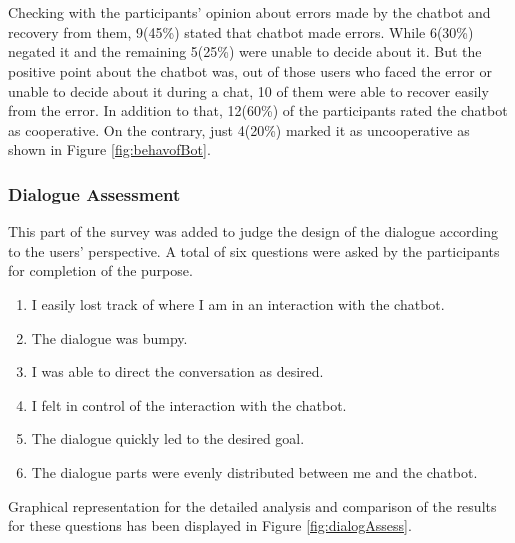 \\~\\
Checking with the participants' opinion about errors made by the chatbot and recovery from them, 9(45\%) stated that chatbot made errors. While 6(30\%) negated it and the remaining 5(25\%) were unable to decide about it. But the positive point about the chatbot was, out of those users who faced the error or unable to decide about it during a chat, 10 of them were able to recover easily from the error. In addition to that, 12(60\%) of the participants rated the chatbot as cooperative. On the contrary, just 4(20\%) marked it as uncooperative as shown in Figure \ref{fig:behavofBot}.


\subsubsection*{Dialogue Assessment}
This part of the survey was added to judge the design of the dialogue according to the users' perspective. A total of six questions were asked by the participants for completion of the purpose.
\begin{enumerate}
    \item I easily lost track of where I am in an interaction with the chatbot.
    \item The dialogue was bumpy.
    \item I was able to direct the conversation as desired.
    \item I felt in control of the interaction with the chatbot.
    \item The dialogue quickly led to the desired goal.
    \item The dialogue parts were evenly distributed between me and the chatbot.
\end{enumerate}
Graphical representation for the detailed analysis and comparison of the results for these questions has been displayed in Figure \ref{fig:dialogAssess}.

